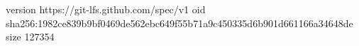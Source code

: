 version https://git-lfs.github.com/spec/v1
oid sha256:1982ce839b9bf0469de562ebc649f55b71a9c450335d6b901d661166a34648de
size 127354
